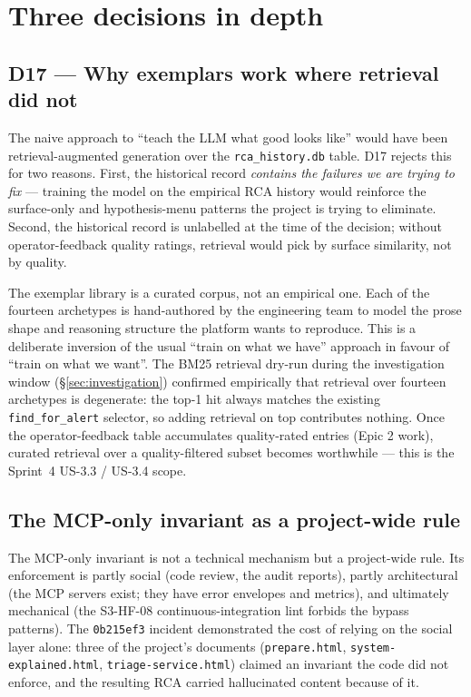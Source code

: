 \documentclass[11pt,a4paper,oneside]{report}
\begin{document}
\section{Three decisions in depth}

\subsection{D17 --- Why exemplars work where retrieval did not}

The naive approach to ``teach the LLM what good looks like'' would
have been retrieval-augmented generation over the
\texttt{rca\_history.db} table.  D17 rejects this for two reasons.
First, the historical record \emph{contains the failures we are
trying to fix} --- training the model on the empirical RCA history
would reinforce the surface-only and hypothesis-menu patterns the
project is trying to eliminate.  Second, the historical record is
unlabelled at the time of the decision; without operator-feedback
quality ratings, retrieval would pick by surface similarity, not by
quality.

The exemplar library is a curated corpus, not an empirical one.  Each
of the fourteen archetypes is hand-authored by the engineering team
to model the prose shape and reasoning structure the platform wants
to reproduce.  This is a deliberate inversion of the usual
``train on what we have'' approach in favour of ``train on what we
want''.  The BM25 retrieval dry-run during the investigation window
(\S\ref{sec:investigation}) confirmed empirically that retrieval over
fourteen archetypes is degenerate: the top-1 hit always matches the
existing \texttt{find\_for\_alert} selector, so adding retrieval on
top contributes nothing.  Once the operator-feedback table accumulates
quality-rated entries (Epic 2 work), curated retrieval over a
quality-filtered subset becomes worthwhile --- this is the Sprint~4
US-3.3 / US-3.4 scope.

\subsection{The MCP-only invariant as a project-wide rule}

The MCP-only invariant is not a technical mechanism but a
project-wide rule.  Its enforcement is partly social (code review,
the audit reports), partly architectural (the MCP servers exist;
they have error envelopes and metrics), and ultimately mechanical
(the S3-HF-08 continuous-integration lint forbids the bypass
patterns).  The \texttt{0b215ef3} incident demonstrated the cost of
relying on the social layer alone: three of the project's documents
(\texttt{prepare.html}, \texttt{system-explained.html},
\texttt{triage-service.html}) claimed an invariant the code did not
enforce, and the resulting RCA carried hallucinated content because
of it.
\end{document}

